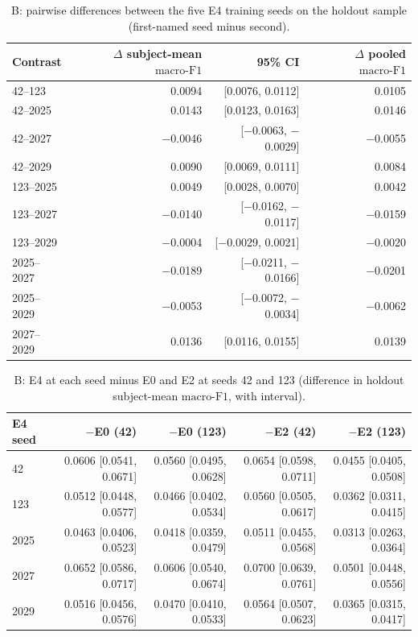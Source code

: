 \documentclass[10pt,a4paper]{article}
\newcommand{\mf}{\ensuremath{\mathrm{macro\text{-}F1}}}
\newcommand{\ci}{95\% CI}
\begin{document}
\begin{table}[H]
\centering\small
\caption{B: pairwise differences between the five E4 training seeds on the holdout sample (first-named
seed minus second).}
\label{tab:sup_a2_seeds}
\begin{tabular}{lrrr}
\toprule
Contrast & $\Delta$ subject-mean \mf & \ci & $\Delta$ pooled \mf \\
\midrule
42--123 & 0.0094 & [0.0076, 0.0112] & 0.0105 \\
42--2025 & 0.0143 & [0.0123, 0.0163] & 0.0146 \\
42--2027 & $-$0.0046 & [$-$0.0063, $-$0.0029] & $-$0.0055 \\
42--2029 & 0.0090 & [0.0069, 0.0111] & 0.0084 \\
123--2025 & 0.0049 & [0.0028, 0.0070] & 0.0042 \\
123--2027 & $-$0.0140 & [$-$0.0162, $-$0.0117] & $-$0.0159 \\
123--2029 & $-$0.0004 & [$-$0.0029, 0.0021] & $-$0.0020 \\
2025--2027 & $-$0.0189 & [$-$0.0211, $-$0.0166] & $-$0.0201 \\
2025--2029 & $-$0.0053 & [$-$0.0072, $-$0.0034] & $-$0.0062 \\
2027--2029 & 0.0136 & [0.0116, 0.0155] & 0.0139 \\
\bottomrule
\end{tabular}
\end{table}

\begin{table}[H]
\centering\small
\caption{B: E4 at each seed minus E0 and E2 at seeds 42 and 123 (difference in holdout subject-mean
\mf, with interval).}
\label{tab:sup_a2_contrasts}
\begin{tabular}{lrrrr}
\toprule
E4 seed & $-$E0 (42) & $-$E0 (123) & $-$E2 (42) & $-$E2 (123) \\
\midrule
42 & 0.0606 [0.0541, 0.0671] & 0.0560 [0.0495, 0.0628] & 0.0654 [0.0598, 0.0711] & 0.0455 [0.0405, 0.0508] \\
123 & 0.0512 [0.0448, 0.0577] & 0.0466 [0.0402, 0.0534] & 0.0560 [0.0505, 0.0617] & 0.0362 [0.0311, 0.0415] \\
2025 & 0.0463 [0.0406, 0.0523] & 0.0418 [0.0359, 0.0479] & 0.0511 [0.0455, 0.0568] & 0.0313 [0.0263, 0.0364] \\
2027 & 0.0652 [0.0586, 0.0717] & 0.0606 [0.0540, 0.0674] & 0.0700 [0.0639, 0.0761] & 0.0501 [0.0448, 0.0556] \\
2029 & 0.0516 [0.0456, 0.0576] & 0.0470 [0.0410, 0.0533] & 0.0564 [0.0507, 0.0623] & 0.0365 [0.0315, 0.0417] \\
\bottomrule
\end{tabular}
\end{table}
\end{document}
